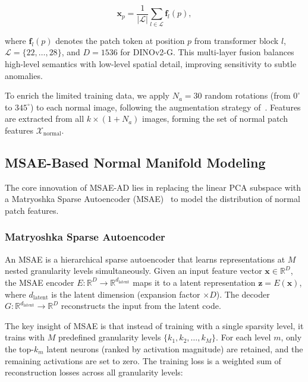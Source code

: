 \begin{equation}
    \mathbf{x}_p = \frac{1}{|\mathcal{L}|} \sum_{l \in \mathcal{L}} \mathbf{f}_l(p),
    \label{eq:feature_agg}
\end{equation}

where $\mathbf{f}_l(p)$ denotes the patch token at position $p$ from transformer block $l$, $\mathcal{L} = \{22, \ldots, 28\}$, and $D = 1536$ for DINOv2-G.
This multi-layer fusion balances high-level semantics with low-level spatial detail, improving sensitivity to subtle anomalies.

To enrich the limited training data, we apply $N_a = 30$ random rotations (from $0^\circ$ to $345^\circ$) to each normal image, following the augmentation strategy of~\cite{Lendering2025SubspaceAD}.
Features are extracted from all $k \times (1 + N_a)$ images, forming the set of normal patch features $\mathcal{X}_{\text{normal}}$.

\subsection{MSAE-Based Normal Manifold Modeling}

\label{sec:msae_modeling}

The core innovation of MSAE-AD lies in replacing the linear PCA subspace with a Matryoshka Sparse Autoencoder (MSAE)~\cite{Zaigrajew2025MSAE} to model the distribution of normal patch features.

\subsubsection{Matryoshka Sparse Autoencoder}

An MSAE is a hierarchical sparse autoencoder that learns representations at $M$ nested granularity levels simultaneously.
Given an input feature vector $\mathbf{x} \in \mathbb{R}^D$, the MSAE encoder $E: \mathbb{R}^D \rightarrow \mathbb{R}^{d_{\text{latent}}}$ maps it to a latent representation $\mathbf{z} = E(\mathbf{x})$, where $d_{\text{latent}}$ is the latent dimension (expansion factor $\times D$).
The decoder $G: \mathbb{R}^{d_{\text{latent}}} \rightarrow \mathbb{R}^D$ reconstructs the input from the latent code.

The key insight of MSAE is that instead of training with a single sparsity level, it trains with $M$ predefined granularity levels $\{k_1, k_2, \ldots, k_M\}$.
For each level $m$, only the top-$k_m$ latent neurons (ranked by activation magnitude) are retained, and the remaining activations are set to zero.
The training loss is a weighted sum of reconstruction losses across all granularity levels:

